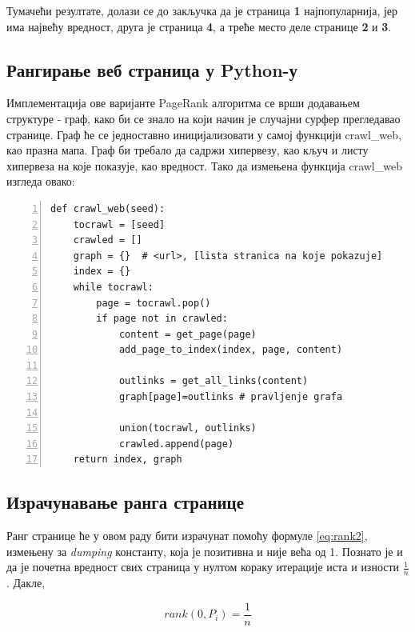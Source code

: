 Тумачећи резултате, долази се до закључка да је страница \textbf{1} најпопуларнија, јер има највећу вредност, друга је страница \textbf{4}, а треће место деле странице \textbf{2} и \textbf{3}.

\subsection{Рангирање веб страница у Python-у}

Имплементација ове варијанте PageRank алгоритма
се врши додавањем структуре - граф, како би се знало на који начин је случајни
сурфер
прегледавао странице. Граф ће се једноставно иницијализовати у
самој функцији crawl\_web, као празна мапа. Граф би требало да садржи
хипервезу, као кључ и листу хипервеза на које показује, као вредност. Тако да измењена функција crawl\_web изгледа овако:

\begin{lstlisting}[caption=Увођење графа у crawl\_web, label={lst:graph}, numbers=left]
def crawl_web(seed):
    tocrawl = [seed]
    crawled = []
    graph = {}  # <url>, [lista stranica na koje pokazuje]
    index = {}
    while tocrawl:
        page = tocrawl.pop()
        if page not in crawled:
            content = get_page(page)
            add_page_to_index(index, page, content)

            outlinks = get_all_links(content)
            graph[page]=outlinks # pravljenje grafa

            union(tocrawl, outlinks)
            crawled.append(page)
    return index, graph
\end{lstlisting}

\subsection{Израчунавање ранга странице}

Ранг странице ће у овом раду бити израчунат помоћу формуле \ref{eq:rank2}, измењену за \emph{dumping} константу, која је позитивна и није већа од 1. Познато је и да је почетна вредност свих страница у нултом кораку итерације иста и изности $\frac{1}{n}$. Дакле,

\begin{equation}\label{eq:zero}
rank(0, P_{i})=\frac{1}{n}
\end{equation}


